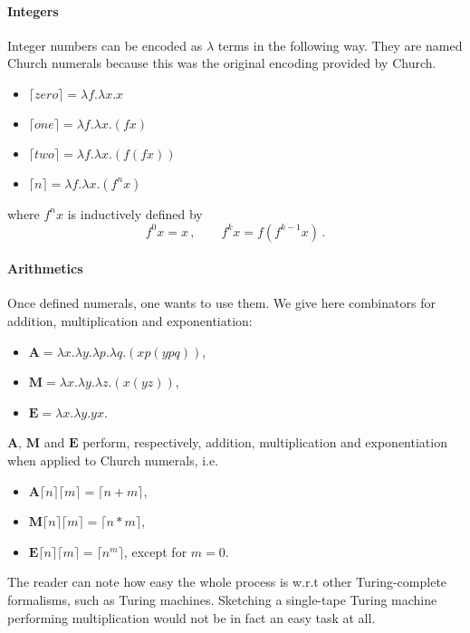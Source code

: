 \paragraph{Integers}
Integer numbers can be encoded as $\lambda$ terms in the following way. They are named Church numerals because this was the original encoding provided by Church.
\begin{itemize}
	\item $\lceil zero\rceil=\lambda f.\lambda x.x$
	\item $\lceil one\rceil=\lambda f.\lambda x.(fx)$
	\item $\lceil two\rceil=\lambda f.\lambda x.(f(fx))$
	\item $\lceil n\rceil=\lambda f.\lambda x.(f^nx)$
\end{itemize}
where $f^nx$ is inductively defined by
$$
f^0x=x\,,\qquad f^kx=f(f^{k-1}x)\,.
$$
\paragraph{Arithmetics}
Once defined numerals, one wants to use them. We give here combinators for addition, multiplication and exponentiation:
\begin{itemize}
	\item $\mathbf{A}=\lambda x.\lambda y.\lambda p.\lambda q.(xp(ypq))$,
	\item $\mathbf{M}=\lambda x.\lambda y.\lambda z.(x(yz))$,
	\item $\mathbf{E}=\lambda x.\lambda y.yx$.
\end{itemize}
\begin{proposition}
	$\mathbf{A}$, $\mathbf{M}$ and $\mathbf{E}$ perform, respectively, addition, multiplication and exponentiation when applied to Church numerals, i.e.
	\begin{itemize}
		\item $\mathbf{A}\lceil n\rceil\lceil m\rceil=\lceil n+m\rceil$,
		\item $\mathbf{M}\lceil n\rceil\lceil m\rceil=\lceil n*m\rceil$,
		\item $\mathbf{E}\lceil n\rceil\lceil m\rceil=\lceil n^m\rceil$, except for $m=0$.
	\end{itemize}
\end{proposition}
The reader can note how easy the whole process is w.r.t other Turing-complete formalisms, such as Turing machines. Sketching a single-tape Turing machine performing multiplication would not be in fact an easy task at all.

